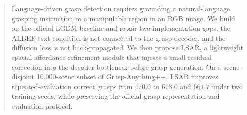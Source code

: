 \begin{abstract}
Language-driven grasp detection requires grounding a natural-language
grasping instruction to a manipulable region in an RGB image.  We build on the
official LGDM baseline and repair two implementation gaps: the ALBEF text
condition is not connected to the grasp decoder, and the diffusion loss is not
back-propagated.  We then propose LSAR, a lightweight spatial affordance
refinement module that injects a small residual correction into the decoder
bottleneck before grasp generation.  On a scene-disjoint 10{,}000-scene subset
of Grasp-Anything++, LSAR improves repeated-evaluation correct grasps from
$470.0$ to $678.0$ and $661.7$ under two training seeds, while preserving the
official grasp representation and evaluation protocol.
\end{abstract}
